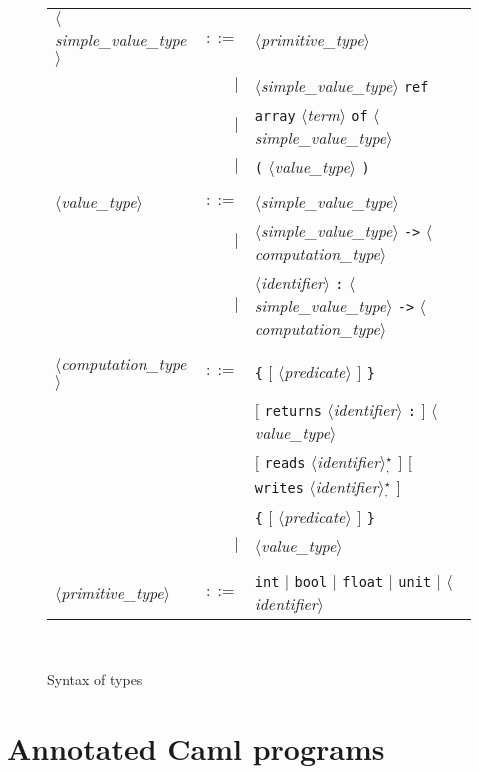 \documentclass[a4paper,12pt]{report}
\newcommand{\te}[1]{\texttt{#1}}
\newcommand{\nt}[1]{$\langle$\textsl{#1}$\rangle$}
\newcommand{\etoilesep}[1]{$^{\star}_#1$}
\begin{document}
\begin{figure}[htbp]
\begin{center}
\hrulefill\\
\begin{tabular}{lrl}
  \nt{simple\_value\_type}
    & $::=$ & \nt{primitive\_type} \\
      & $|$ & \nt{simple\_value\_type} \te{ref} \\
      & $|$ & \te{array} \nt{term} \te{of} \nt{simple\_value\_type} \\
      & $|$ & \te{(} \nt{value\_type} \te{)} \\
  \\[0.1em]

  \nt{value\_type}
    & $::=$ & \nt{simple\_value\_type} \\
      & $|$ & \nt{simple\_value\_type} \te{->} \nt{computation\_type} \\
      & $|$ & \nt{identifier} \te{:} \nt{simple\_value\_type} 
              \te{->} \nt{computation\_type} \\
  \\[0.1em]

  \nt{computation\_type}
    & $::=$ & \te{\{} $[$ \nt{predicate} $]$ \te{\}} \\
      &     & $[$ \te{returns} \nt{identifier} \te{:} $]$ \nt{value\_type} \\
      &     & $[$ \te{reads} \nt{identifier}\etoilesep{\te{,}} $]$
              $[$ \te{writes}  \nt{identifier}\etoilesep{\te{,}}  $]$ \\
      &     & \te{\{} $[$ \nt{predicate} $]$ \te{\}} \\
      & $|$ & \nt{value\_type} \\
  \\[0.1em]

  \nt{primitive\_type}
    & $::=$ & \te{int} $|$ \te{bool} $|$ \te{float} $|$ 
              \te{unit} $|$ \nt{identifier}
\end{tabular}\\
\hrulefill
\caption{Syntax of types}
\label{fig:types}
\end{center}            
\end{figure}

\section{Annotated Caml programs}
\end{document}

